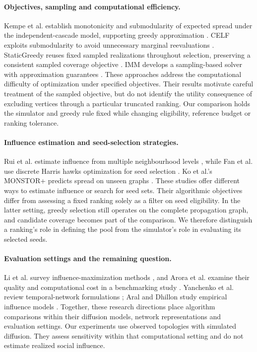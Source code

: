 \documentclass[smallextended]{svjour3}
\begin{document}
\paragraph{Objectives, sampling and computational efficiency.} Kempe et al. establish monotonicity and submodularity of expected spread under the independent-cascade model, supporting greedy approximation \cite{ref1}. CELF exploits submodularity to avoid unnecessary marginal reevaluations \cite{ref7}. StaticGreedy reuses fixed sampled realizations throughout selection, preserving a consistent sampled coverage objective \cite{ref8}. IMM develops a sampling-based solver with approximation guarantees \cite{ref2}. These approaches address the computational difficulty of optimization under specified objectives. Their results motivate careful treatment of the sampled objective, but do not identify the utility consequence of excluding vertices through a particular truncated ranking. Our comparison holds the simulator and greedy rule fixed while changing eligibility, reference budget or ranking tolerance.

\paragraph{Influence estimation and seed-selection strategies.} Rui et al. estimate influence from multiple neighbourhood levels \cite{ref12}, while Fan et al. use discrete Harris hawks optimization for seed selection \cite{ref13}. Ko et al.'s MONSTOR+ predicts spread on unseen graphs \cite{ref19}. These studies offer different ways to estimate influence or search for seed sets. Their algorithmic objectives differ from assessing a fixed ranking solely as a filter on seed eligibility. In the latter setting, greedy selection still operates on the complete propagation graph, and candidate coverage becomes part of the comparison. We therefore distinguish a ranking's role in defining the pool from the simulator's role in evaluating its selected seeds.

\paragraph{Evaluation settings and the remaining question.} Li et al. survey influence-maximization methods \cite{ref9}, and Arora et al. examine their quality and computational cost in a benchmarking study \cite{ref16}. Yanchenko et al. review temporal-network formulations \cite{ref11}; Aral and Dhillon study empirical influence models \cite{ref15}. Together, these research directions place algorithm comparisons within their diffusion models, network representations and evaluation settings. Our experiments use observed topologies with simulated diffusion. They assess sensitivity within that computational setting and do not estimate realized social influence.
\end{document}
